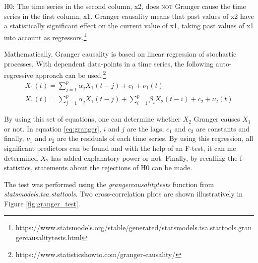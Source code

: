 \documentclass[11pt]{article}
\begin{document}
H0: The time series in the second column, x2, does \textsc{not} Granger cause the time series in the first column, x1. Granger causality means that past values of x2 have a statistically significant effect on the current value of x1, taking past values of x1 into account as regressors.\footnote{https://www.statsmodels.org/stable/generated/statsmodels.tsa.stattools.grangercausalitytests.html}

Mathematically, Granger causality is based on linear regression of stochastic processes. With dependent data-points in a time series, the following auto-regressive approach can be used:\footnote{https://www.statisticshowto.com/granger-causality/}
\begin{equation} \label{eq:granger}
    \begin{split}
        X_1(t) = \sum_{j=1}^p{\alpha_j X_1(t-j)} + c_1 + \nu_1(t) \\
        X_1(t) = \sum_{j=1}^p{\alpha_j X_1(t-j)} + \sum_{i=1}^p{\beta_i X_2(t-i)+ c_2 + \nu_2(t)}
    \end{split}
\end{equation}

By using this set of equations, one can determine whether $X_2$ Granger causes $X_1$ or not. In equation \ref{eq:granger}, $i$ and $j$ are the lags, $c_1$ and $c_2$ are constants and finally, $\nu_1$ and $\nu_2$ are the residuals of each time series.
\newline
By using this regression, all significant predictors can be found and with the help of an F-test, it can me determined $X_2$ has added explanatory power or not.
Finally, by recalling the f-statistics, statements about the rejections of H0 can be made. 

\newpage
The test was performed using the \textit{grangercausalitytests} function from \textit{statsmodels.tsa.stattools}.
Two cross-correlation plots are shown illustratively in Figure \ref{fig:granger_test}.
\end{document}
